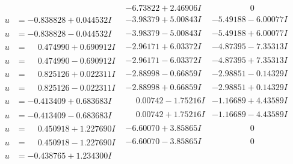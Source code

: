 \documentclass[1p]{elsarticle_modified}
\theoremstyle{definition}
\begin{document}
$$\begin{array}{c|c|c}
 & -6.73822 + 2.46906 I & \phantom{-0.000000 } 0 \\ \hline\begin{aligned}
u &= -0.838828 + 0.044532 I\end{aligned}
 & -3.98379 + 5.00843 I & -5.49188 - 6.00077 I \\ \hline\begin{aligned}
u &= -0.838828 - 0.044532 I\end{aligned}
 & -3.98379 - 5.00843 I & -5.49188 + 6.00077 I \\ \hline\begin{aligned}
u &= \phantom{-}0.474990 + 0.690912 I\end{aligned}
 & -2.96171 + 6.03372 I & -4.87395 - 7.35313 I \\ \hline\begin{aligned}
u &= \phantom{-}0.474990 - 0.690912 I\end{aligned}
 & -2.96171 - 6.03372 I & -4.87395 + 7.35313 I \\ \hline\begin{aligned}
u &= \phantom{-}0.825126 + 0.022311 I\end{aligned}
 & -2.88998 - 0.66859 I & -2.98851 - 0.14329 I \\ \hline\begin{aligned}
u &= \phantom{-}0.825126 - 0.022311 I\end{aligned}
 & -2.88998 + 0.66859 I & -2.98851 + 0.14329 I \\ \hline\begin{aligned}
u &= -0.413409 + 0.683683 I\end{aligned}
 & \phantom{-}0.00742 - 1.75216 I & -1.16689 + 4.43589 I \\ \hline\begin{aligned}
u &= -0.413409 - 0.683683 I\end{aligned}
 & \phantom{-}0.00742 + 1.75216 I & -1.16689 - 4.43589 I \\ \hline\begin{aligned}
u &= \phantom{-}0.450918 + 1.227690 I\end{aligned}
 & -6.60070 + 3.85865 I & \phantom{-0.000000 } 0 \\ \hline\begin{aligned}
u &= \phantom{-}0.450918 - 1.227690 I\end{aligned}
 & -6.60070 - 3.85865 I & \phantom{-0.000000 } 0 \\ \hline\begin{aligned}
u &= -0.438765 + 1.234300 I\end{aligned}

\end{array}$$
\end{document}
